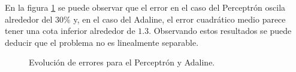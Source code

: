 \documentclass[spanish]{assignment}
\begin{document}
	En la figura \ref{fig:p2} se puede observar que el error en el caso del Perceptrón oscila alrededor del $30\%$ y, 
	en el caso del Adaline, el error cuadrático medio parece tener una cota inferior alrededor de $1.3$. Observando estos resultados se puede deducir que el problema no es linealmente separable.
	\begin{center}
		\begin{figure}
			\caption{Evolución de errores para el Perceptrón y Adaline.}	
			\label{fig:p2}
		\end{figure}
	\end{center}
	
\end{document}
